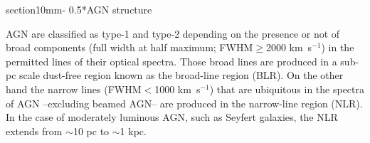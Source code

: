 \documentclass{natureprintstyle}
\makeatletter
\renewcommand{\section}{\@startsection%
{section}{1}{0mm}{-\baselineskip}%
{0.5\baselineskip}{\normalfont\Large\bfseries}}%
\makeatother
\begin{document}

 


\section*{AGN structure}




AGN are classified as type-1 and type-2 depending on the presence or not of broad components (full width at half maximum; FWHM$\geq$2000 km~s$^{-1}$) in the permitted lines of their optical spectra. Those broad lines are produced in a sub-pc scale dust-free region known as the broad-line region (BLR). On the other hand the narrow lines (FWHM$<$1000 km~s$^{-1}$) that are ubiquitous in the spectra of AGN --excluding beamed AGN-- are produced in the narrow-line region (NLR). {In the case of moderately luminous AGN, such as Seyfert galaxies, the NLR extends from $\sim$10 pc to $\sim$1 kpc\cite{Capetti96}. }

\end{document}
